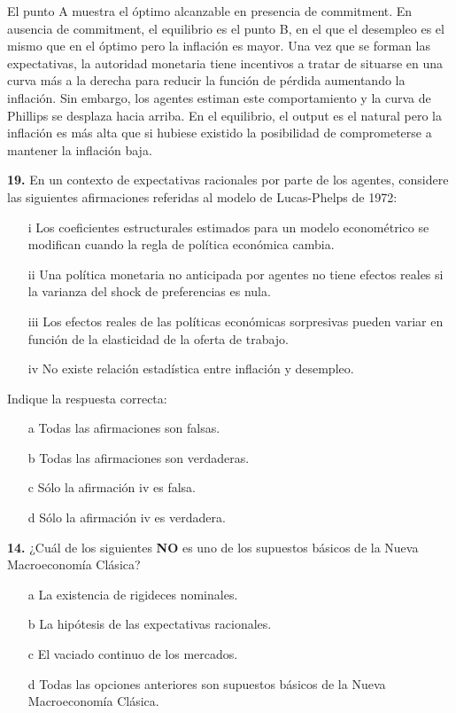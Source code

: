 \documentclass{nuevotema}
\begin{document}
El punto A muestra el óptimo alcanzable en presencia de commitment. En ausencia de commitment, el equilibrio es el punto B, en el que el desempleo es el mismo que en el óptimo pero la inflación es mayor. Una vez que se forman las expectativas, la autoridad monetaria tiene incentivos a tratar de situarse en una curva más a la derecha para reducir la función de pérdida aumentando la inflación. Sin embargo, los agentes estiman este comportamiento y la curva de Phillips se desplaza hacia arriba. En el equilibrio, el output es el natural pero la inflación es más alta que si hubiese existido la posibilidad de comprometerse a mantener la inflación baja.

\preguntas


\textbf{19.} En un contexto de expectativas racionales por parte de los agentes, considere las siguientes afirmaciones referidas al modelo de Lucas-Phelps de 1972:


\begin{itemize}
	\item[i] Los coeficientes estructurales estimados para un modelo econométrico se modifican cuando la regla de política económica cambia.
	\item[ii] Una política monetaria no anticipada por agentes no tiene efectos reales si la varianza del shock de preferencias es nula.
	\item[iii] Los efectos reales de las políticas económicas sorpresivas pueden variar en función de la elasticidad de la oferta de trabajo.
	\item[iv] No existe relación estadística entre inflación y desempleo.
\end{itemize}

Indique la respuesta correcta:

\begin{itemize}
	\item[a] Todas las afirmaciones son falsas.
	\item[b] Todas las afirmaciones son verdaderas.
	\item[c] Sólo la afirmación iv es falsa.
	\item[d] Sólo la afirmación iv es verdadera.
\end{itemize}


\textbf{14.} ¿Cuál de los siguientes \textbf{NO} es uno de los supuestos básicos de la Nueva Macroeconomía Clásica? 

\begin{itemize}
	\item[a] La existencia de rigideces nominales.
	\item[b] La hipótesis de las expectativas racionales.
	\item[c] El vaciado continuo de los mercados.
	\item[d] Todas las opciones anteriores son supuestos básicos de la Nueva Macroeconomía Clásica.
\end{itemize}
\end{document}
